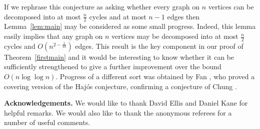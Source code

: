 \documentclass[11pt]{article}
\begin{document}
If we rephrase this conjecture as asking whether every graph on $n$ vertices can be decomposed into at most $\frac{n}{2}$ cycles and at most $n - 1$ edges then Lemma~\ref{lem:main} may be considered as some small progress. Indeed, this lemma easily implies that any graph on $n$ vertices may be decomposed into at most $\frac{n}{2}$ cycles and $O(n^{2 - \frac{1}{10}})$ edges. This result is the key component in our proof of Theorem~\ref{firstmain} and it would be interesting to know whether it can be sufficiently strengthened to give a further improvement over the bound $O(n \log \log n)$. Progress of a different sort was obtained by Fan \cite{F03}, who proved a covering version of the Haj\'os conjecture, confirming a conjecture of Chung \cite{C80}.

\vspace{2mm}
{\bf Acknowledgements.} We would like to thank David Ellis and Daniel Kane for helpful remarks. We would also like to thank the anonymous referees for a number of useful comments.
\end{document}
